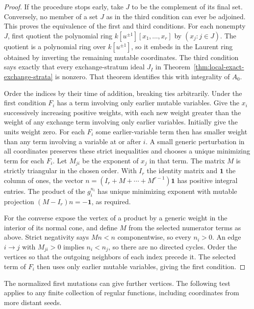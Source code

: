 \documentclass[11pt,reqno]{amsart}
\numberwithin{equation}{section}
\theoremstyle{definition}
\theoremstyle{remark}
\begin{document}
\begin{proof}
If the procedure stops early, take \(J\) to be the complement of
its final set. Conversely, no member of a set \(J\) as in the third
condition can ever be adjoined. This proves the equivalence of the
first and third conditions. For each nonempty \(J\), first quotient the polynomial ring
\(k[u^{\pm1}][x_1,\ldots,x_r]\) by \((x_j:j\in J)\). The quotient
is a polynomial ring over \(k[u^{\pm1}]\), so it embeds in the Laurent
ring obtained by inverting the remaining mutable coordinates. The third condition says exactly that
every exchange-stratum ideal \(J_I\) in
Theorem~\ref{thm:local-exact-exchange-strata} is nonzero. That theorem
identifies this with integrality of \(A_0\).

Order the indices by their time of addition, breaking ties arbitrarily.
Under the first condition \(F_i\) has a term involving only earlier
mutable variables. Give the \(x_i\) successively increasing positive
weights, with each new weight greater than the weight of any exchange
term involving only earlier variables. Initially give the units weight
zero. For each \(F_i\) some earlier-variable term then has smaller
weight than any term involving a variable at or after \(i\). A small
generic perturbation in all coordinates preserves these strict
inequalities and chooses a unique minimizing term for each \(F_i\).
Let \(M_{ji}\) be the exponent of \(x_j\) in that term. The matrix
\(M\) is strictly triangular in the chosen order. With \(I_r\) the
identity matrix and \(\mathbf1\) the column of ones, the vector
\(n=(I_r+M+\cdots+M^{r-1})\mathbf1\) has positive integral entries. The product of the \(g_i^{n_i}\) has
unique minimizing exponent with mutable projection
\((M-I_r)n=-\mathbf1\), as required.

For the converse expose the vertex of a product by a generic
weight in the interior of its normal cone, and define \(M\) from the
selected numerator terms as above. Strict negativity says
\(Mn<n\) componentwise, so every \(n_i>0\). An edge
\(i\to j\) with \(M_{ji}>0\) implies \(n_i<n_j\), so there are
no directed cycles. Order the vertices so that the outgoing
neighbors of each index precede it. The selected term of \(F_i\)
then uses only earlier mutable variables, giving the first condition.
\end{proof}

The normalized first mutations can give further vertices. The following test applies to any finite collection of regular
functions, including coordinates from more distant seeds.
\end{document}
